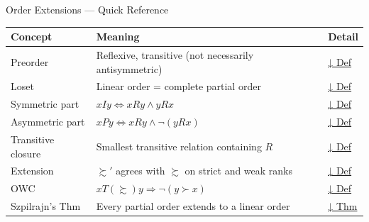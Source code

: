 

\begin{toolkitbox}{Order Extensions — Quick Reference}
\small
\begin{tabular}{l l l}
\toprule
\textbf{Concept} & \textbf{Meaning} & \textbf{Detail} \\
\midrule
Preorder            & Reflexive, transitive (not necessarily antisymmetric)         & \hyperref[def:preorder]{↓ Def} \\
Loset               & Linear order = complete partial order                        & \hyperref[def:loset]{↓ Def} \\
Symmetric part      & $xIy \iff xRy \land yRx$                                     & \hyperref[def:sym-asym]{↓ Def} \\
Asymmetric part     & $xPy \iff xRy \land \lnot(yRx)$                              & \hyperref[def:sym-asym]{↓ Def} \\
Transitive closure  & Smallest transitive relation containing $R$                  & \hyperref[def:trans-closure]{↓ Def} \\
Extension           & $\succsim'$ agrees with $\succsim$ on strict and weak ranks  & \hyperref[def:extension]{↓ Def} \\
OWC                 & $xT(\succsim)y \Rightarrow \lnot(y \succ x)$                 & \hyperref[def:owc]{↓ Def} \\
Szpilrajn's Thm     & Every partial order extends to a linear order                & \hyperref[thm:szpilrajn]{↓ Thm} \\
\bottomrule
\end{tabular}
\end{toolkitbox}



